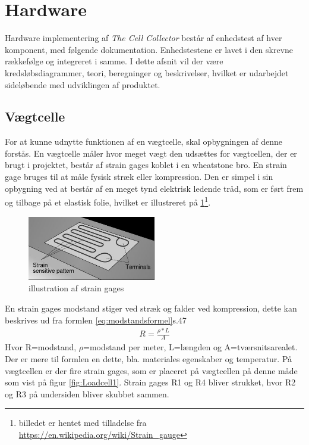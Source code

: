   \section{Hardware}
  Hardware implementering af \textit{The Cell Collector} består af enhedstest af hver komponent, med følgende dokumentation. Enhedstestene er lavet i den skrevne rækkefølge og integreret i samme. I dette afsnit vil der være kredsløbsdiagrammer, teori, beregninger og beskrivelser, hvilket er udarbejdet sideløbende med udviklingen af produktet. 
 	
 \subsection{Vægtcelle}
 For at kunne udnytte funktionen af en vægtcelle, skal opbygningen af denne forstås. En vægtcelle måler hvor meget vægt den udsættes for vægtcellen, der er brugt i projektet, består af strain gages koblet i en wheatstone bro. En strain gage bruges til at måle fysisk stræk eller kompression. Den er simpel i sin opbygning ved at består af en meget tynd elektrisk ledende tråd, som er ført frem og tilbage på et elastisk folie, hvilket er illustreret på \ref{fig:Strain gages}\footnote{billedet er hentet med tilladelse fra  \url{https://en.wikipedia.org/wiki/Strain_gauge}}. 
 \begin{figure}[H]
	\centering
	\includegraphics[width=0.5\textwidth]{billeder/Hardware/straingages1.JPG}
	\caption{illustration af strain gages}
	\label{fig:Strain gages}
\end{figure}
En strain gages modstand stiger ved stræk og falder ved kompression, dette kan beskrives ud fra formlen \ref{eq:modstandsformel}\citep{Websterbog}{s.47}
 \begin{align}
 R=\frac{\rho*L}{A}
 \label{eq:modstandsformel}
 \end{align}
 Hvor R=modstand, $\rho$=modstand per meter, L=længden og A=tværsnitsarealet. Der er mere til formlen en dette, bla. materiales egenskaber og temperatur. På vægtcellen er der fire strain gages, som er placeret på vægtcellen på denne måde som vist på figur \ref{fig:Loadcell1}. Strain gages R1 og R4 bliver strukket, hvor R2 og R3 på undersiden bliver skubbet sammen.
 
